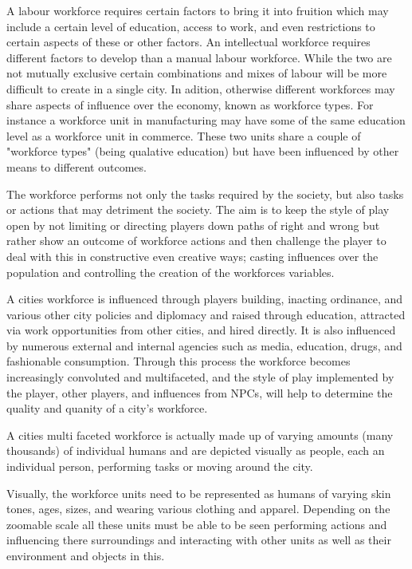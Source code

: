 A labour workforce requires certain factors to bring it into fruition which may include a certain level of education, access to work, and even restrictions to certain aspects of these or other factors. An intellectual workforce requires different factors to develop than a manual labour workforce. While the two are not mutually exclusive certain combinations and mixes of labour will be more difficult to create in a single city. In adition, otherwise different workforces may share aspects of influence over the economy, known as workforce types. For instance a workforce unit in manufacturing may have some of the same education level as a workforce unit in commerce. These two units share a couple of "workforce types" (being qualative education) but have been influenced by other means to different outcomes. 

The workforce performs not only the tasks required by the society, but also tasks or actions that may detriment the society. The aim is to keep the style of play open by not limiting or directing players down paths of right and wrong but rather show an outcome of workforce actions and then challenge the player to deal with this in constructive even creative ways; casting influences over the population and controlling the creation of the workforces variables. 

A cities workforce is influenced through players building, inacting ordinance, and various other city policies and diplomacy and raised through education, attracted via work opportunities from other cities, and hired directly. It is also influenced by numerous external and internal agencies such as media, education, drugs, and fashionable consumption. Through this process the workforce becomes increasingly convoluted and multifaceted, and the style of play implemented by the player, other players, and influences from NPCs, will help to determine the quality and quanity of a city's workforce. 

A cities multi faceted workforce is actually made up of varying amounts (many thousands) of individual humans and are depicted visually as people, each an individual person, performing tasks or moving around the city.  

Visually, the workforce units need to be represented as humans of varying skin tones, ages, sizes, and wearing various clothing and apparel. Depending on the zoomable scale all these units must be able to be seen performing actions and influencing there surroundings and interacting with other units as well as their environment and objects in this. 

